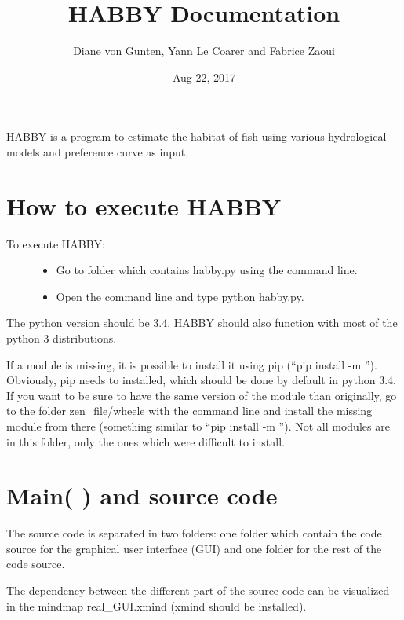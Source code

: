 \documentclass[letterpaper,10pt,english]{sphinxmanual}
\title{HABBY Documentation}
\date{Aug 22, 2017}
\author{Diane von Gunten, Yann Le Coarer and Fabrice Zaoui}
\begin{document}
\maketitle
\sphinxtableofcontents
{}\label{\detokenize{index::doc}}


HABBY is a program to estimate the habitat of fish using various hydrological models and preference curve as input.


\chapter{How to execute HABBY}
\label{\detokenize{index:welcome-to-habby-s-documentation}}\label{\detokenize{index:how-to-execute-habby}}\begin{description}
\item[{To execute HABBY:}] \leavevmode\begin{itemize}
\item {} 
Go to folder which contains habby.py using the command line.

\item {} 
Open the command line and type python habby.py.

\end{itemize}

\end{description}

The python version should be 3.4. HABBY should also function with most of the python 3 distributions.

If a module is missing, it is possible to install it using pip (``pip install -m ''). Obviously, pip needs to installed, which should be done by default in python 3.4. If you want to be sure to have the same version of the module than originally, go to the folder zen\_file/wheele with the command line and install the missing module from there (something similar to ``pip install -m ''). Not all modules are in this folder, only the ones which were difficult to install.


\chapter{Main(   ) and source code}
\label{\detokenize{index:main-and-source-code}}
The source code is separated in two folders: one folder which contain the code source for the graphical user interface (GUI) and one folder for the rest of the code source.

The dependency between the different part of the source code can be visualized in the mindmap real\_GUI.xmind (xmind should be installed).
\end{document}
